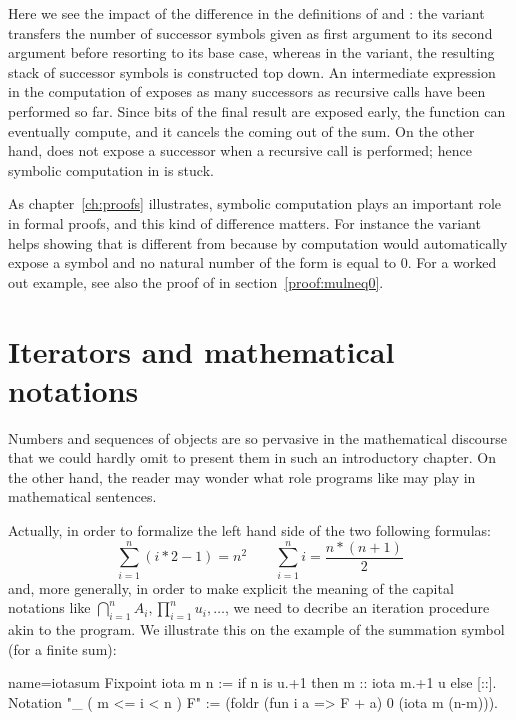 Here we see the impact of the difference in the definitions of
 and : the  variant transfers the
number of  successor symbols 
given as first argument to its second argument
before resorting to its base case, whereas in the  variant,
the resulting stack of successor symbols is constructed top down. An
intermediate
expression in the computation of  exposes as many
successors as recursive calls have been performed so far. Since bits
of the final result are exposed early, the  function can
eventually compute, and it cancels the  coming out of the sum.
On the other hand,
 does not expose a successor when a recursive call is
performed; hence symbolic computation in  is stuck.

As chapter~\ref{ch:proofs} illustrates, symbolic computation plays an
important role in formal proofs, and this kind of difference
matters. For instance the  variant helps
showing that  is different from  because by
computation \Coq{} would automatically expose  a  symbol
and no natural number of the form  is equal to 0.
For a worked out example, see also the proof of  in
section~\ref{proof:mulneq0}.


\section{Iterators and mathematical notations}
\label{sec:bigopnat}

Numbers and sequences of objects are so pervasive in the mathematical
discourse that we could hardly omit to present them in such an
introductory chapter. On the other hand, the reader may wonder what role
programs like  may play in mathematical sentences.

Actually, in order to formalize the left hand side of the two
following formulas:
$$
\sum_{i=1}^n (i * 2 - 1) = n ^ 2 \qquad
\sum_{i=1}^n i = \frac{n * (n + 1)}{2}
$$
and, more generally, in order to make explicit the meaning of the capital
notations like $\bigcap_{i=1}^nA_i,
\prod_{i=1}^nu_i, \dots$, we need to decribe an iteration procedure
akin to the  program. We illustrate this on the example of
the summation symbol (for a finite sum):

\begin{coq}{name=iotasum}{}
Fixpoint iota m n := if n is u.+1 then m :: iota m.+1 u else [::].
Notation "\sum_ ( m <= i < n ) F" :=
  (foldr (fun i a => F + a) 0 (iota m (n-m))).
\end{coq}
\index[coq]{\C{\\sum}}

